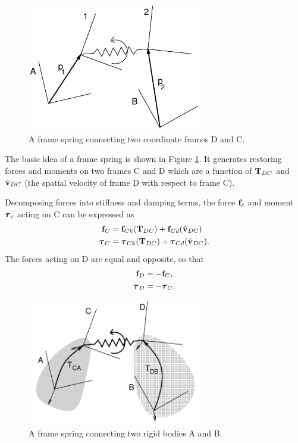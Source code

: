 \begin{figure}[h]
\begin{center}
 \includegraphics[width=3in]{images/frameSpring}
\end{center}
\caption{A frame spring connecting two coordinate frames D and C.}
\label{frameSpring:fig}
\end{figure}

The basic idea of a frame spring is shown in Figure
\ref{frameSpring:fig}. It generates restoring forces and moments on
two frames C and D which are a function of ${\bf T}_{DC}$ and $\hat{{\bf v}}_{DC}$
(the spatial velocity of frame D with respect to frame C).

Decomposing forces into stiffness and damping terms, the force
${\bf f}_c$ and moment $\boldsymbol\tau_c$ acting on C can be expressed as 
%
\begin{align}
{\bf f}_C & = {\bf f}_{Ck} ({\bf T}_{DC}) + {\bf f}_{Cd} (\hat{{\bf v}}_{DC}) \notag \\
\boldsymbol\tau_C & = \boldsymbol\tau_{Ck} ({\bf T}_{DC}) + \boldsymbol\tau_{Cd} (\hat{{\bf v}}_{DC}).
\label{ftauC:eqn}
\end{align}
%
The forces acting on D are equal and opposite, so that
%
\begin{align}
{\bf f}_D & = - {\bf f}_C, \notag \\
\boldsymbol\tau_D & = - \boldsymbol\tau_C.
\label{ftau2:eqn}
\end{align}
%

\begin{figure}[h]
\begin{center}
 \includegraphics[width=3in]{images/frameSpringBodies}
\end{center}
\caption{A frame spring connecting two rigid bodies A and B.}
\label{frameSpringBodies:fig}
\end{figure}

